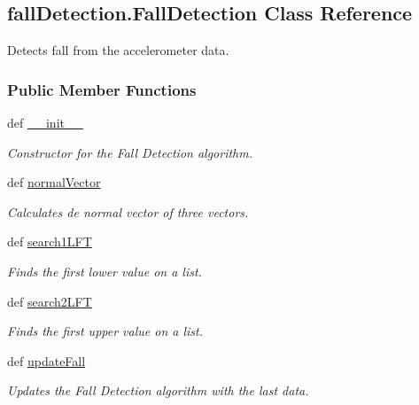 \hypertarget{classfall_detection_1_1_fall_detection}{\subsection{fall\-Detection.\-Fall\-Detection Class Reference}
\label{classfall_detection_1_1_fall_detection}
}


Detects fall from the accelerometer data.  


\subsubsection*{Public Member Functions}
\begin{DoxyCompactItemize}
\item 
def \hyperlink{classfall_detection_1_1_fall_detection_a3bdf921ddeab54c9eb78231e64e3f8c1}{\-\_\-\-\_\-init\-\_\-\-\_\-}
\begin{DoxyCompactList}\small\item\em Constructor for the Fall Detection algorithm. \end{DoxyCompactList}\item 
def \hyperlink{classfall_detection_1_1_fall_detection_a47ae3cde72ec28563e117e16d9e0d962}{normal\-Vector}
\begin{DoxyCompactList}\small\item\em Calculates de normal vector of three vectors. \end{DoxyCompactList}\item 
def \hyperlink{classfall_detection_1_1_fall_detection_aad3c9071e7a676843cdd968fef66bb56}{search1\-L\-F\-T}
\begin{DoxyCompactList}\small\item\em Finds the first lower value on a list. \end{DoxyCompactList}\item 
def \hyperlink{classfall_detection_1_1_fall_detection_a15d331e7cde45376a1ed81628f4fd37b}{search2\-L\-F\-T}
\begin{DoxyCompactList}\small\item\em Finds the first upper value on a list. \end{DoxyCompactList}\item 
def \hyperlink{classfall_detection_1_1_fall_detection_ace430c2a9f1d9d20e5ef1794693a0895}{update\-Fall}
\begin{DoxyCompactList}\small\item\em Updates the Fall Detection algorithm with the last data. \end{DoxyCompactList}\item 

\end{DoxyCompactItemize}
